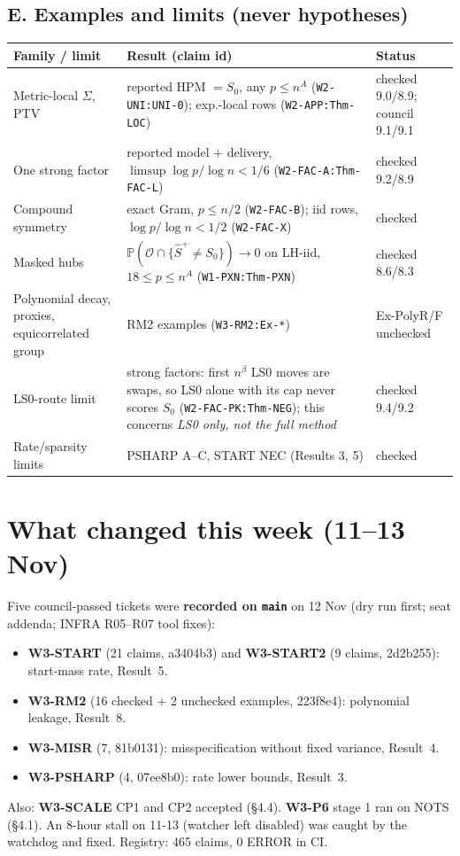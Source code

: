 \documentclass[11pt,a4paper]{article}
\newcommand{\cid}[1]{\texttt{\small #1}}
\newcommand{\Szero}{S_0}
\newcommand{\Shat}{\hat S^{+}}
\newcommand{\Out}{\mathcal{O}}
\newcommand{\Prob}{\mathbb{P}}
\theoremstyle{definition}
\begin{document}
\subsection*{E. Examples and limits (never hypotheses)}
{\small
\begin{tabularx}{\linewidth}{@{}>{\raggedright\arraybackslash}p{3.6cm} >{\raggedright\arraybackslash}X >{\raggedright\arraybackslash}p{3.2cm}@{}}
\toprule
Family / limit & Result (claim id) & Status\\
\midrule
Metric-local $\Sigma$, PTV & reported HPM $=\Szero$, any $p\le n^A$ (\cid{W2-UNI:UNI-0}); exp.-local rows (\cid{W2-APP:Thm-LOC}) & checked 9.0/8.9; council 9.1/9.1\\
One strong factor & reported model $+$ delivery, $\limsup\log p/\log n<1/6$ (\cid{W2-FAC-A:Thm-FAC-L}) & checked 9.2/8.9\\
Compound symmetry & exact Gram, $p\le n/2$ (\cid{W2-FAC-B}); iid rows, $\log p/\log n<1/2$ (\cid{W2-FAC-X}) & checked\\
Masked hubs & $\Prob(\Out\cap\{\Shat\neq\Szero\})\to0$ on LH-iid, $18\le p\le n^A$ (\cid{W1-PXN:Thm-PXN}) & checked 8.6/8.3\\
Polynomial decay, proxies, equicorrelated group & RM2 examples (\cid{W3-RM2:Ex-*}) & Ex-PolyR/F unchecked\\
\midrule
LS0-route limit & strong factors: first $n^{\beta}$ LS0 moves are swaps, so LS0 alone with its cap never scores $\Szero$ (\cid{W2-FAC-PK:Thm-NEG}); this concerns \emph{LS0 only, not the full method} & checked 9.4/9.2\\
Rate/sparsity limits & PSHARP A--C, START NEC (Results 3, 5) & checked\\
\bottomrule
\end{tabularx}}

\section{What changed this week (11--13 Nov)}
Five council-passed tickets were \textbf{recorded on \texttt{main}} on 12 Nov (dry run first; seat addenda; INFRA R05--R07 tool fixes):
\begin{itemize}
\item \textbf{W3-START} (21 claims, a3404b3) and \textbf{W3-START2} (9 claims, 2d2b255): start-mass rate, Result~5.
\item \textbf{W3-RM2} (16 checked $+$ 2 unchecked examples, 223f8e4): polynomial leakage, Result~8.
\item \textbf{W3-MISR} (7, 81b0131): misspecification without fixed variance, Result~4.
\item \textbf{W3-PSHARP} (4, 07ee8b0): rate lower bounds, Result~3.
\end{itemize}
Also: \textbf{W3-SCALE} CP1 and CP2 accepted (\S4.4). \textbf{W3-P6} stage 1 ran on NOTS (\S4.1). An 8-hour stall on
11-13 (watcher left disabled) was caught by the watchdog and fixed. Registry: 465 claims, 0 ERROR in CI.
\end{document}
